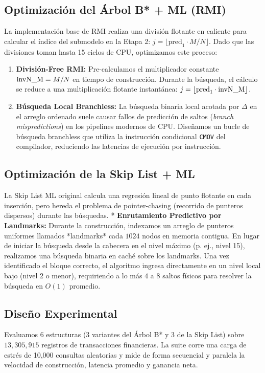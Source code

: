 \documentclass[twocolumn,10pt,journal]{IEEEtran}
\begin{document}
\subsection{Optimizaci\'on del \'Arbol B* + ML (RMI)}
La implementaci\'on base de RMI realiza una divisi\'on flotante en caliente para calcular el \'indice del submodelo en la Etapa 2: $j = \lfloor \text{pred}_1 \cdot M / N \rfloor$. Dado que las divisiones toman hasta 15 ciclos de CPU, optimizamos este proceso:
\begin{enumerate}
    \item \textbf{Divisi\'on-Free RMI:} Pre-calculamos el multiplicador constante $\text{invN\textunderscore M} = M / N$ en tiempo de construcci\'on. Durante la b\'usqueda, el c\'alculo se reduce a una multiplicaci\'on flotante instant\'anea: $j = \lfloor \text{pred}_1 \cdot \text{invN\textunderscore M} \rfloor$.
    \item \textbf{B\'usqueda Local Branchless:} La b\'usqueda binaria local acotada por $\Delta$ en el arreglo ordenado suele causar fallos de predicci\'on de saltos (\textit{branch mispredictions}) en los pipelines modernos de CPU. Diseñamos un bucle de b\'usqueda branchless que utiliza la instrucci\'on condicional \texttt{CMOV} del compilador, reduciendo las latencias de ejecuci\'on por instrucci\'on.
\end{enumerate}

\subsection{Optimizaci\'on de la Skip List + ML}
La Skip List ML original calcula una regresi\'on lineal de punto flotante en cada inserci\'on, pero hereda el problema de pointer-chasing (recorrido de punteros dispersos) durante las b\'usquedas.
* \textbf{Enrutamiento Predictivo por Landmarks:} Durante la construcci\'on, indexamos un arreglo de punteros uniformes llamados *landmarks* cada $1024$ nodos en memoria contigua. En lugar de iniciar la b\'usqueda desde la cabecera en el nivel m\'aximo (p. ej., nivel 15), realizamos una b\'usqueda binaria en cach\'e sobre los landmarks. Una vez identificado el bloque correcto, el algoritmo ingresa directamente en un nivel local bajo (nivel 2 o menor), requiriendo a lo m\'as $4$ a $8$ saltos f\'isicos para resolver la b\'usqueda en $O(1)$ promedio.

\subsection{Diseño Experimental}
Evaluamos 6 estructuras (3 variantes del \'Arbol B* y 3 de la Skip List) sobre $13{,}305{,}915$ registros de transacciones financieras. La suite corre una carga de estr\'es de 10,000 consultas aleatorias y mide de forma secuencial y paralela la velocidad de construcci\'on, latencia promedio y ganancia neta.
\end{document}
